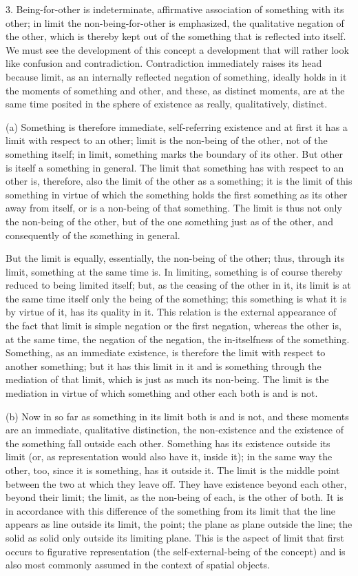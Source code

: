 3. Being-for-other is indeterminate, affirmative
association of something with its other;
in limit the non-being-for-other is emphasized,
the qualitative negation of the other,
which is thereby kept out of the something
that is reflected into itself.
We must see the development of this concept
a development that will rather look like
confusion and contradiction.
Contradiction immediately raises its head because limit,
as an internally reflected negation of something,
ideally holds in it the moments of something and other,
and these, as distinct moments, are at the same time
posited in the sphere of existence as really, qualitatively, distinct.

(a) Something is therefore immediate, self-referring existence
and at first it has a limit with respect to an other;
limit is the non-being of the other,
not of the something itself;
in limit, something marks the boundary of its other.
But other is itself a something in general.
The limit that something has with respect to
an other is, therefore, also the limit of
the other as a something;
it is the limit of this something in virtue of which
the something holds the first something
as its other away from itself,
or is a non-being of that something.
The limit is thus not only the non-being of the other,
but of the one something just as of the other,
and consequently of the something in general.

But the limit is equally, essentially,
the non-being of the other;
thus, through its limit,
something at the same time is.
In limiting, something is of course thereby
reduced to being limited itself;
but, as the ceasing of the other in it,
its limit is at the same time itself
only the being of the something;
this something is what it is by virtue of it,
has its quality in it.
This relation is the external appearance of the fact
that limit is simple negation or the first negation,
whereas the other is, at the same time,
the negation of the negation,
the in-itselfness of the something.
Something, as an immediate existence,
is therefore the limit with respect
to another something;
but it has this limit in it
and is something through the mediation of that limit,
which is just as much its non-being.
The limit is the mediation in virtue of
which something and other each both is and is not.

(b) Now in so far as something in its limit
both is and is not,
and these moments are an immediate, qualitative distinction,
the non-existence and the existence of the something
fall outside each other.
Something has its existence outside its limit
(or, as representation would also have it, inside it);
in the same way the other, too,
since it is something, has it outside it.
The limit is the middle point
between the two at which they leave off.
They have existence beyond each other, beyond their limit;
the limit, as the non-being of each,
is the other of both.
It is in accordance with this difference
of the something from its limit
that the line appears as line outside its limit, the point;
the plane as plane outside the line;
the solid as solid only outside its limiting plane.
This is the aspect of limit that
first occurs to figurative representation
(the self-external-being of the concept)
and is also most commonly assumed
in the context of spatial objects.

